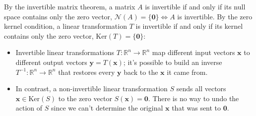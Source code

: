 \begin{paracol}{2}



By the invertible matrix theorem, a matrix $A$ is invertible if and only if its null space contains only the zero vector, $\mathcal{N}(A) = \{ \mathbf{0} \} \iff A$ is invertible. By the zero kernel condition, a linear transformation $T$ is invertible if and only if its kernel contains only the zero vector, $\text{Ker}(T) = \{ \mathbf{0} \}$:

\begin{itemize}
    \item Invertible linear transformations $T: \mathbb{R}^n \rightarrow \mathbb{R}^n$ map different input vectors $\mathbf{x}$ to different output vectors $\mathbf{y} = T(\mathbf{x})$; it's possible to build an inverse $T^{-1}: \mathbb{R}^n \rightarrow \mathbb{R}^n$ that restores every $\mathbf{y}$ back to the $\mathbf{x}$ it came from.
    \vspace{-5pt}
    \item In contrast, a non-invertible linear transformation $S$ sends all vectors $\mathbf{x} \in \text{Ker}(S)$ to the zero vector $S(\mathbf{x}) = \mathbf{0}$. There is no way to undo the action of $S$ since we can't determine the original $\mathbf{x}$ that was sent to $\mathbf{0}$.
\end{itemize}


\end{paracol}

